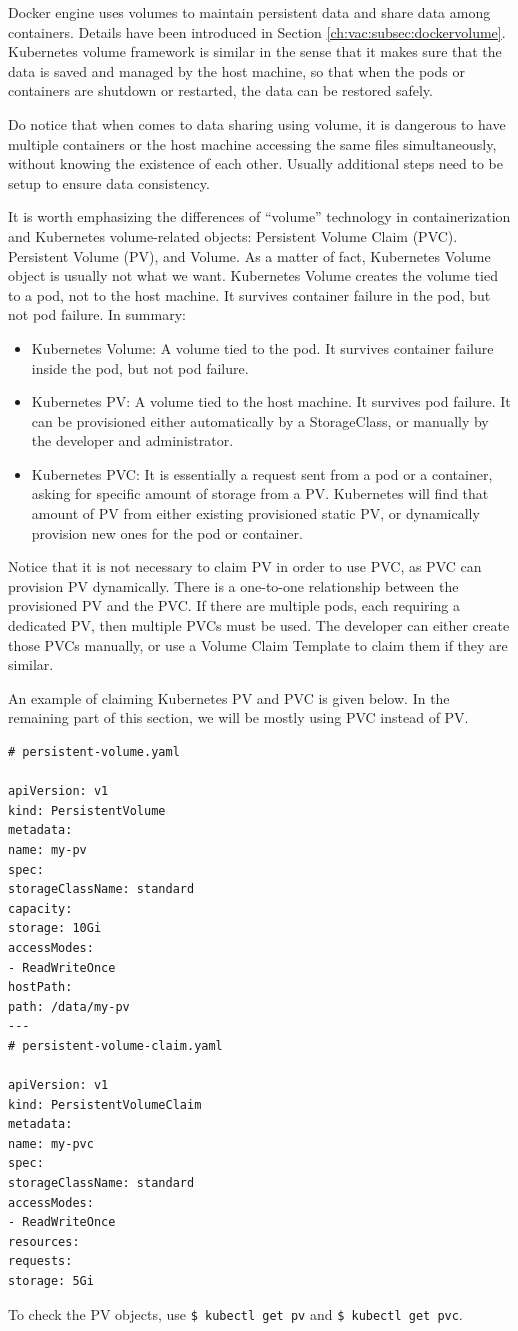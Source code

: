 Docker engine uses volumes to maintain persistent data and share data among containers. Details have been introduced in Section \ref{ch:vac:subsec:dockervolume}. Kubernetes volume framework is similar in the sense that it makes sure that the data is saved and managed by the host machine, so that when the pods or containers are shutdown or restarted, the data can be restored safely.

Do notice that when comes to data sharing using volume, it is dangerous to have multiple containers or the host machine accessing the same files simultaneously, without knowing the existence of each other. Usually additional steps need to be setup to ensure data consistency.

It is worth emphasizing the differences of ``volume'' technology in containerization and Kubernetes volume-related objects: Persistent Volume Claim (PVC). Persistent Volume (PV), and Volume. As a matter of fact, Kubernetes Volume object is usually not what we want. Kubernetes Volume creates the volume tied to a pod, not to the host machine. It survives container failure in the pod, but not pod failure. In summary:
\begin{itemize}
	\item Kubernetes Volume: A volume tied to the pod. It survives container failure inside the pod, but not pod failure.
	\item Kubernetes PV: A volume tied to the host machine. It survives pod failure. It can be provisioned either automatically by a StorageClass, or manually by the developer and administrator.
	\item Kubernetes PVC: It is essentially a request sent from a pod or a container, asking for specific amount of storage from a PV. Kubernetes will find that amount of PV from either existing provisioned static PV, or dynamically provision new ones for the pod or container.
\end{itemize}
Notice that it is not necessary to claim PV in order to use PVC, as PVC can provision PV dynamically. There is a one-to-one relationship between the provisioned PV and the PVC. If there are multiple pods, each requiring a dedicated PV, then multiple PVCs must be used. The developer can either create those PVCs manually, or use a Volume Claim Template to claim them if they are similar.

An example of claiming Kubernetes PV and PVC is given below. In the remaining part of this section, we will be mostly using PVC instead of PV.
\begin{lstlisting}
# persistent-volume.yaml

apiVersion: v1
kind: PersistentVolume
metadata:
name: my-pv
spec:
storageClassName: standard
capacity:
storage: 10Gi
accessModes:
- ReadWriteOnce
hostPath:
path: /data/my-pv
---
# persistent-volume-claim.yaml

apiVersion: v1
kind: PersistentVolumeClaim
metadata:
name: my-pvc
spec:
storageClassName: standard
accessModes:
- ReadWriteOnce
resources:
requests:
storage: 5Gi
\end{lstlisting}
To check the PV objects, use \verb|$ kubectl get pv| and \verb|$ kubectl get pvc|.

